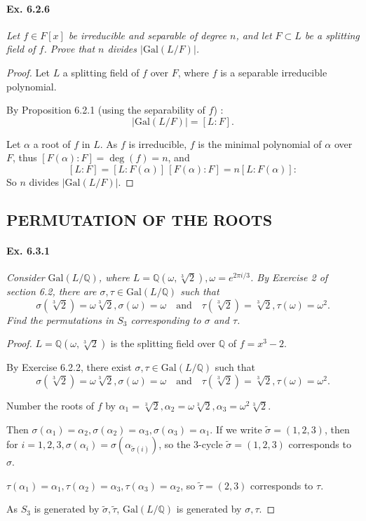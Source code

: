 \documentclass[11pt,a4paper]{article}
\newcommand{\Q}{\mathbb{Q}}
\newcommand{\Gal}{\mathrm{Gal}}
\begin{document}
\paragraph{Ex. 6.2.6}

{\it Let $f \in F[x]$ be irreducible and separable of degree $n$, and let $F\subset L$ be a splitting field of $f$. Prove that $n$ divides $\vert \Gal(L/F)\vert$.
}

\begin{proof}
Let $L$ a splitting field of  $f$ over $F$, where $f$ is a separable irreducible polynomial.


By Proposition 6.2.1 (using the separability of $f$) :
$$\vert \Gal(L/F) \vert =[L:F].$$

Let $\alpha$ a root of  $f$ in  $L$. As $f$ is irreducible, $f$ is the minimal polynomial of $\alpha$ over $F$, thus $[F(\alpha) : F] = \deg(f) = n$, and
$$[L:F] = [L:F(\alpha)]\, [F(\alpha) : F] = n [L:F(\alpha)] :$$
So $n$ divides $\vert \Gal(L/F) \vert$.




\end{proof}

\subsection{PERMUTATION OF THE ROOTS}

\paragraph{Ex. 6.3.1}

{\it Consider $\Gal(L/\Q)$, where $L = \Q(\omega,\sqrt[3]{2}), \omega = e^{2 \pi i/3}$. By Exercise 2 of section 6.2, there are $\sigma, \tau \in \Gal(L/\Q)$ such that
$$\sigma(\sqrt[3]{2}) = \omega \sqrt[3]{2}, \sigma(\omega) = \omega \quad \mathrm{and} \quad \tau(\sqrt[3]{2}) = \sqrt[3]{2}, \tau (\omega) = \omega^2.$$
Find the permutations in $S_3$ corresponding to $\sigma$ and $\tau$.
}

\begin{proof}
 $L = \Q(\omega,\sqrt[3]{2})$ is the splitting field over $\Q$ of $f=x^3-2$.

By Exercise 6.2.2, there exist $\sigma,\tau \in \Gal(L/\Q)$ such that
$$\sigma(\sqrt[3]{2}) = \omega\sqrt[3]{2}, \sigma(\omega) = \omega \quad \mathrm{and} \quad \tau(\sqrt[3]{2}) = \sqrt[3]{2}, \tau(\omega) = \omega^2.$$

Number the roots of $f$ by $\alpha_1 = \sqrt[3]{2}, \alpha_2 = \omega\sqrt[3]{2}, \alpha_3 = \omega^2\sqrt[3]{2}$.

Then $\sigma(\alpha_1) = \alpha_2, \sigma(\alpha_2) =\alpha_3, \sigma(\alpha_3) = \alpha_1$. If we write $\tilde{\sigma} = (1,2,3)$, then for $i=1,2,3, \sigma(\alpha_i) = \sigma(\alpha_{\tilde{\sigma}(i)})$, so the 3-cycle $\tilde{\sigma} =(1,2,3)$ corresponds to $\sigma$.

$\tau(\alpha_1) = \alpha_1, \tau(\alpha_2) = \alpha_3, \tau(\alpha_3) = \alpha_2$, so $\tilde{\tau} = (2,3)$  corresponds to $\tau$.

As $S_3$ is generated by $\tilde{\sigma}, \tilde{\tau}$, $ \Gal(L/\Q)$ is generated by $\sigma,\tau$.
\end{proof}
\end{document}
